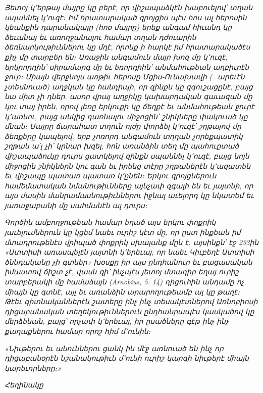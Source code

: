 \documentclass{article}
\begin{document}
{\emph{Յետոյ կ՚երթայ մայրը կը բերէ, որ վիշապաձկէն խաբուելով՝ տղան սպաննել կ՚ուզէ։ Իմ հրատարակած զրոյցիս պէս հոս ալ հերոսին կեանքին դարանակալը (հոօ մայրը) երեք անգամ հիւանդ կը ձեւանայ եւ առողջանալու համար տղան դժուարին ձեռնարկութիւններու կը մղէ, որոնք ի հարկէ իմ հրատարակածէս քիչ մը տարբեր են։ Առաջին անգամուն մայր խոզ մը կ՚ուզէ, երկրորդին՝ սիրամարգ մը եւ եռորդիին՝ անմահութեան աղբիւրէն ջուր։ Միայն վերջնոյս առթիւ հերոսը Մցիս֊Ունախավի (=արեւէն չտեսնուած) աղջկան կը հանդիպի, որ զինքն կը զգուշացընէ, բայց նա միտ չի դներ. ասոր վրայ աղջիկը կախարդական գաւազան մը կու տայ իրեն, որով լեռը երկուքի կը ճեղքէ եւ անմահութեան ջուրէ կ՚առնու, բայց անկից դառնալու միջոցին՝ շնիկները փակուած կը մնան։ Մայրը ճարահատ տղուն ոյժը փորձել կ՚ուզէ՝ շղթայով մը ձեռքերը կապելով, երբ չոռորդ անգամուն տղղան չորեքպատիկ շղթան ա՛լ չի՛ կրնար խզել, հոն առանձին տեղ մը պահուըտած վիշապաձուկը դուրս ցատկելով զինքն սպաննել կ՚ուզէ, բայց նոյն միջոցին շնիկներն կու գան եւ իրենց տէրը շղթաներէն կ՚ազատեն եւ վիշապը պատառ պատառ կ՚ընեն։ Երկու զրոյցներուն համեմատական նմանութիւնները այնչափ զգալի են եւ յայտնի, որ այս մասին մանրամասնութիւններու իջնալ աւելորդ կը նկատեմ եւ յառաջաբանի մը սահմանէն ալ դուրս։}

\emph{Գործին ամբողջութեան համար եղած այս երկու փոքրիկ յաւելումներուն կը կցեմ նաեւ ուրիշ կէտ մը, որ ըստ ինքեան իմ մտադրութենէս վրիպած փոքրիկ սխալանք մըն է. այսինքն՝ էջ 233ին «Ատտիսի առասպելէն յայտնի կ՚երեւայ, որ նաեւ Կիւբեղէ Ատտիսի ծննդականը չի գտներ» խօսքը իր այս ընդհանուր եւ բացասական իմաստով ճիշտ չէ, վասն զի՝ ինչպէս յետոյ մտադիր եղայ ուրիշ տարբերակի մը համաձայն (Arnobius, 5. 14) դիցուհին անդամը ոչ միայն կը գտնէ, այլ եւ առանձին արարողութեամբ ալ կը թաղէ։ Թէեւ գիտնականներէն շատերը ինչ ինչ տեսակէտներով Առնոբիոսի դիցաբանական տեղեկութիւններուն ընդհանրապէս կասկածով կը մերձենան, բայց՝ որչափ կ՚երեւայ, իր ըսածները գէթ ինչ ինչ քաղաքներու համար որոշ հիմ մ՚ունին։}

\emph{«Նիւթերու եւ անուններու ցանկ ին մէջ առնուած են ինչ որ դիցաբանօրէն նշանակութիւն մ՚ունի ուրիշ կարգի նիւթերէ միայն կարեւորները։»}

\bigskip

\emph{Հեղինակը}
}
\clearpage
\section*{}
\small
\end{document}
